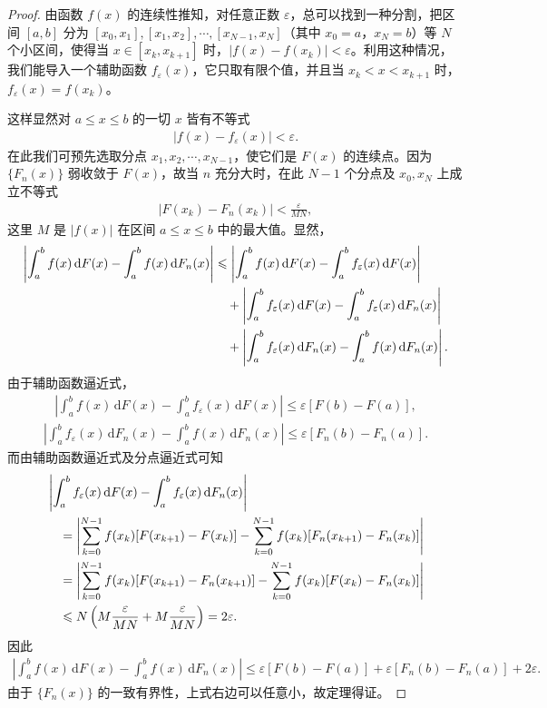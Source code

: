 \documentclass[../../main.tex]{subfiles}
\begin{document}
\begin{proof}
由函数 $f(x)$ 的连续性推知，对任意正数 $\varepsilon$，总可以找到一种分割，把区间 $[a,b]$ 分为 $[x_0,x_1],[x_1,x_2],\cdots,[x_{N-1},x_N]$（其中 $x_0=a$，$x_N=b$）等 $N$ 个小区间，使得当 $x\in[x_k,x_{k+1}]$ 时，$|f(x)-f(x_k)|<\varepsilon$。利用这种情况，我们能导入一个辅助函数 $f_\varepsilon(x)$，它只取有限个值，并且当 $x_k<x<x_{k+1}$ 时，$f_\varepsilon(x)=f(x_k)$。

这样显然对 $a\leqslant x\leqslant b$ 的一切 $x$ 皆有不等式
\begin{align}
|f(x)-f_\varepsilon(x)|<\varepsilon.
\end{align}
在此我们可预先选取分点 $x_1,x_2,\cdots,x_{N-1}$，使它们是 $F(x)$ 的连续点。因为 $\{F_n(x)\}$ 弱收敛于 $F(x)$，故当 $n$ 充分大时，在此 $N-1$ 个分点及 $x_0,x_N$ 上成立不等式
\begin{align}
|F(x_k)-F_n(x_k)|<\frac{\varepsilon}{MN},
\end{align}
这里 $M$ 是 $|f(x)|$ 在区间 $a\leqslant x\leqslant b$ 中的最大值。显然，
\begin{align}
\left|\int_{a}^{b}f(x)\,\mathrm{d}F(x)-\int_{a}^{b}f(x)\,\mathrm{d}F_n(x)\right|
&\leqslant\left|\int_{a}^{b}f(x)\,\mathrm{d}F(x)-\int_{a}^{b}f_\varepsilon(x)\,\mathrm{d}F(x)\right|\notag\\
&\quad+\left|\int_{a}^{b}f_\varepsilon(x)\,\mathrm{d}F(x)-\int_{a}^{b}f_\varepsilon(x)\,\mathrm{d}F_n(x)\right|\notag\\
&\quad+\left|\int_{a}^{b}f_\varepsilon(x)\,\mathrm{d}F_n(x)-\int_{a}^{b}f(x)\,\mathrm{d}F_n(x)\right|.
\end{align}
由于辅助函数逼近式，
\begin{align}
\left|\int_{a}^{b}f(x)\,\mathrm{d}F(x)-\int_{a}^{b}f_\varepsilon(x)\,\mathrm{d}F(x)\right|\leqslant\varepsilon[F(b)-F(a)],
\end{align}
\begin{align}
\left|\int_{a}^{b}f_\varepsilon(x)\,\mathrm{d}F_n(x)-\int_{a}^{b}f(x)\,\mathrm{d}F_n(x)\right|\leqslant\varepsilon[F_n(b)-F_n(a)].
\end{align}
而由辅助函数逼近式及分点逼近式可知
\begin{align}
&\left|\int_{a}^{b}f_\varepsilon(x)\,\mathrm{d}F(x)-\int_{a}^{b}f_\varepsilon(x)\,\mathrm{d}F_n(x)\right|\notag\\
&\quad=\left|\sum_{k=0}^{N-1}f(x_k)[F(x_{k+1})-F(x_k)]-\sum_{k=0}^{N-1}f(x_k)[F_n(x_{k+1})-F_n(x_k)]\right|\notag\\
&\quad=\left|\sum_{k=0}^{N-1}f(x_k)[F(x_{k+1})-F_n(x_{k+1})]-\sum_{k=0}^{N-1}f(x_k)[F(x_k)-F_n(x_k)]\right|\notag\\
&\quad\leqslant N\left(M\frac{\varepsilon}{MN}+M\frac{\varepsilon}{MN}\right)=2\varepsilon.
\end{align}
因此
\begin{align*}
\left|\int_{a}^{b}f(x)\,\mathrm{d}F(x)-\int_{a}^{b}f(x)\,\mathrm{d}F_n(x)\right|
\leqslant\varepsilon[F(b)-F(a)]+\varepsilon[F_n(b)-F_n(a)]+2\varepsilon.
\end{align*}
由于 $\{F_n(x)\}$ 的一致有界性，上式右边可以任意小，故定理得证。
\end{proof}
\end{document}
